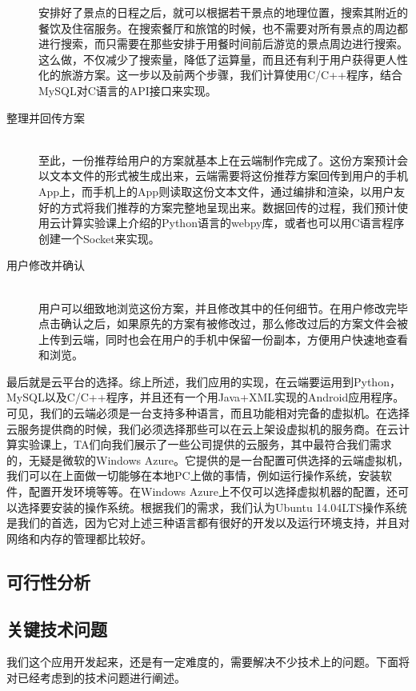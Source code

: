 \documentclass[12pt,a4paper]{article}
\begin{document}
\begin{CJK}{UTF8}{gbsn}
\begin{description}
	安排好了景点的日程之后，就可以根据若干景点的地理位置，搜索其附近的餐饮及住宿服务。在搜索餐厅和旅馆的时候，也不需要对所有景点的周边都进行搜索，而只需要在那些安排于用餐时间前后游览的景点周边进行搜索。这么做，不仅减少了搜索量，降低了运算量，而且还有利于用户获得更人性化的旅游方案。这一步以及前两个步骤，我们计算使用C{\slash}C++程序，结合MySQL对C语言的API接口来实现。
	\item[整理并回传方案] \hfill \\
	至此，一份推荐给用户的方案就基本上在云端制作完成了。这份方案预计会以文本文件的形式被生成出来，云端需要将这份推荐方案回传到用户的手机App上，而手机上的App则读取这份文本文件，通过编排和渲染，以用户友好的方式将我们推荐的方案完整地呈现出来。数据回传的过程，我们预计使用云计算实验课上介绍的Python语言的webpy库，或者也可以用C语言程序创建一个Socket来实现。
	\item[用户修改并确认] \hfill \\
	用户可以细致地浏览这份方案，并且修改其中的任何细节。在用户修改完毕点击确认之后，如果原先的方案有被修改过，那么修改过后的方案文件会被上传到云端，同时也会在用户的手机中保留一份副本，方便用户快速地查看和浏览。
	\end{description}

	最后就是云平台的选择。综上所述，我们应用的实现，在云端要运用到Python，MySQL以及C{\slash}C++程序，并且还有一个用Java+XML实现的Android应用程序。可见，我们的云端必须是一台支持多种语言，而且功能相对完备的虚拟机。在选择云服务提供商的时候，我们必须选择那些可以在云上架设虚拟机的服务商。在云计算实验课上，TA们向我们展示了一些公司提供的云服务，其中最符合我们需求的，无疑是微软的Windows Azure。它提供的是一台配置可供选择的云端虚拟机，我们可以在上面做一切能够在本地PC上做的事情，例如运行操作系统，安装软件，配置开发环境等等。在Windows Azure上不仅可以选择虚拟机器的配置，还可以选择要安装的操作系统。根据我们的需求，我们认为Ubuntu 14.04LTS操作系统是我们的首选，因为它对上述三种语言都有很好的开发以及运行环境支持，并且对网络和内存的管理都比较好。
	
	\subsection{可行性分析}

	\subsection{关键技术问题}
	我们这个应用开发起来，还是有一定难度的，需要解决不少技术上的问题。下面将对已经考虑到的技术问题进行阐述。
	

\end{CJK}
\end{document}
